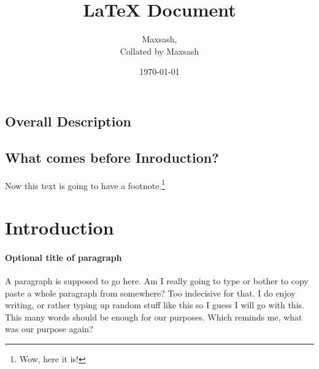 \documentclass{article}
\title{LaTeX Document}
\author{Maxsash, \\Collated by Maxsash} %
\date{\today}
\begin{document}
	\maketitle

	\tableofcontents
	\pagebreak

	\pagestyle{empty}

	\begin{landscape}
		\section{Overall Description}
		\lipsum[1-2]
	\end{landscape}
		
	\setlength{\columnsep}{20pt}
	\setlength{\columnseprule}{1pt}
	\begin{multicols}{3}
		\section{What comes before Inroduction?}
			\lipsum[1-3]
			
			\columnbreak

			Now this text is going to have a footnote.\footnote{Wow, here it is!}
	\end{multicols}

	\section{Introduction}

		\lipsum[1-10]

		\thispagestyle{headings}
		\setcounter{page}{503}

	\paragraph{Optional title of paragraph}
	A paragraph is supposed to go here. Am I really going to type or bother to copy paste a whole paragraph from somewhere? Too indecisive for that. I do enjoy writing, or rather typing up random stuff like this so I guess I will go with this. This many words should be enough for our purposes. Which reminds me, what was our purpose again?
\end{document}
